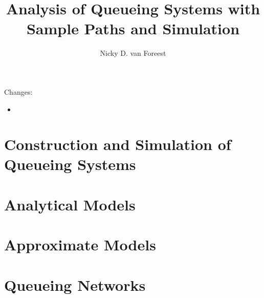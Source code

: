 \author{Nicky D. van  Foreest}
\title{Analysis of Queueing Systems with  Sample Paths and Simulation }


\maketitle

Changes:
\begin{itemize}
\item
\end{itemize}

\tableofcontents





\chapter{Construction and Simulation of Queueing Systems}

\label{cha:single-stat-queu}








\chapter{Analytical Models}















% 
%


\chapter{Approximate Models}
 



%


\chapter{Queueing Networks}
\label{sec:notes-relat-chapt2}

